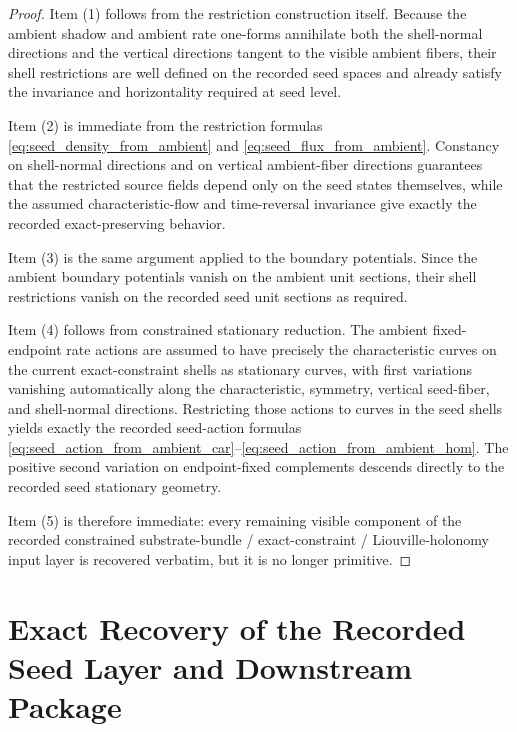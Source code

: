 \documentclass[11pt]{article}
\begin{document}
\begin{proof}
Item (1) follows from the restriction construction itself. Because the ambient shadow and ambient rate one-forms annihilate both the shell-normal directions and the vertical directions tangent to the visible ambient fibers, their shell restrictions are well defined on the recorded seed spaces and already satisfy the invariance and horizontality required at seed level.

Item (2) is immediate from the restriction formulas \eqref{eq:seed_density_from_ambient} and \eqref{eq:seed_flux_from_ambient}. Constancy on shell-normal directions and on vertical ambient-fiber directions guarantees that the restricted source fields depend only on the seed states themselves, while the assumed characteristic-flow and time-reversal invariance give exactly the recorded exact-preserving behavior.

Item (3) is the same argument applied to the boundary potentials. Since the ambient boundary potentials vanish on the ambient unit sections, their shell restrictions vanish on the recorded seed unit sections as required.

Item (4) follows from constrained stationary reduction. The ambient fixed-endpoint rate actions are assumed to have precisely the characteristic curves on the current exact-constraint shells as stationary curves, with first variations vanishing automatically along the characteristic, symmetry, vertical seed-fiber, and shell-normal directions. Restricting those actions to curves in the seed shells yields exactly the recorded seed-action formulas \eqref{eq:seed_action_from_ambient_car}--\eqref{eq:seed_action_from_ambient_hom}. The positive second variation on endpoint-fixed complements descends directly to the recorded seed stationary geometry.

Item (5) is therefore immediate: every remaining visible component of the recorded constrained substrate-bundle / exact-constraint / Liouville-holonomy input layer is recovered verbatim, but it is no longer primitive.
\end{proof}

\section{Exact Recovery of the Recorded Seed Layer and Downstream Package}
\end{document}
